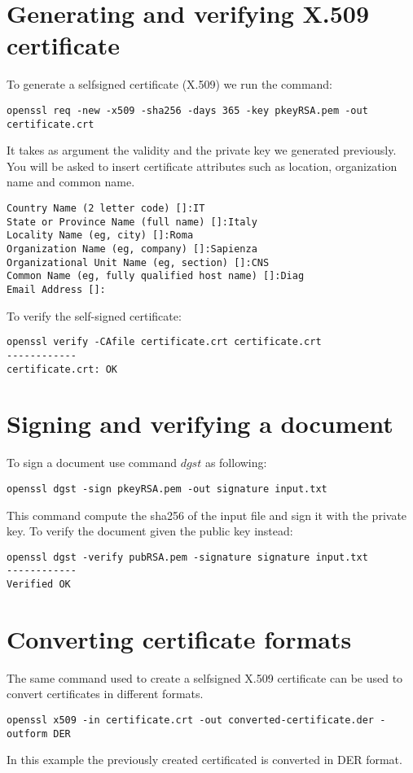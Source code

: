 \documentclass[11pt,a4paper]{article}
\begin{document}
\section{Generating and verifying X.509 certificate}
To generate a selfsigned certificate (X.509) we run the command:
\begin{lstlisting}[backgroundcolor = \color{lightgray}]
openssl req -new -x509 -sha256 -days 365 -key pkeyRSA.pem -out certificate.crt
\end{lstlisting}
It takes as argument the validity and the private key we generated previously. You will be asked to insert certificate attributes such as location, organization name and common name.
\begin{lstlisting}[backgroundcolor = \color{lightgray}]
Country Name (2 letter code) []:IT
State or Province Name (full name) []:Italy
Locality Name (eg, city) []:Roma
Organization Name (eg, company) []:Sapienza
Organizational Unit Name (eg, section) []:CNS
Common Name (eg, fully qualified host name) []:Diag
Email Address []:
\end{lstlisting}
To verify the self-signed certificate:
\begin{lstlisting}[backgroundcolor = \color{lightgray}]
openssl verify -CAfile certificate.crt certificate.crt
------------
certificate.crt: OK
\end{lstlisting}

\section{Signing and verifying a document}
To sign a document use command $dgst$ as following:
\begin{lstlisting}[backgroundcolor = \color{lightgray}]
openssl dgst -sign pkeyRSA.pem -out signature input.txt
\end{lstlisting}
This command compute the sha256 of the input file and sign it with the private key. To verify the document given the public key instead:
\begin{lstlisting}[backgroundcolor = \color{lightgray}]
openssl dgst -verify pubRSA.pem -signature signature input.txt 
------------
Verified OK
\end{lstlisting}

\section{Converting certificate formats}
The same command used to create a selfsigned X.509 certificate can be used to convert certificates in different formats.
\begin{lstlisting}[backgroundcolor = \color{lightgray}]
openssl x509 -in certificate.crt -out converted-certificate.der -outform DER
\end{lstlisting}
In this example the previously created certificated is converted in DER format.
\end{document}
